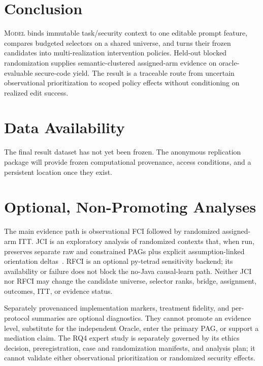 \documentclass[acmsmall,screen,review,anonymous]{acmart}
\newcommand{\model}{\textsc{Model}\xspace}
\begin{document}
\section{Conclusion}

\model binds immutable task/security context to one editable prompt feature,
compares budgeted selectors on a shared universe, and turns their frozen
candidates into multi-realization intervention policies. Held-out blocked
randomization supplies semantic-clustered assigned-arm evidence on
oracle-evaluable secure-code yield. The result is a traceable route from
uncertain observational prioritization to scoped policy effects without
conditioning on realized edit success.

\section{Data Availability}

The final result dataset has not yet been frozen. The anonymous replication
package will provide frozen computational provenance, access conditions, and a
persistent location once they exist.

\appendix

\section{Optional, Non-Promoting Analyses}

The main evidence path is observational FCI followed by randomized assigned-arm
ITT. JCI is an exploratory analysis of randomized contexts that, when run,
preserves separate raw and constrained PAGs plus explicit assumption-linked
orientation deltas~\cite{mooij2020jci}. RFCI is an optional py-tetrad
sensitivity backend; its availability or failure does not block the no-Java
causal-learn path. Neither JCI nor RFCI may change the candidate universe,
selector ranks, bridge, assignment, outcomes, ITT, or evidence status.

Separately provenanced implementation markers, treatment fidelity, and
per-protocol summaries are optional diagnostics. They cannot promote an
evidence level, substitute for the independent Oracle, enter the primary PAG,
or support a mediation claim. The RQ4 expert study is separately governed by
its ethics decision, preregistration, case and randomization manifests, and
analysis plan; it cannot validate either observational prioritization or
randomized security effects.



\end{document}
